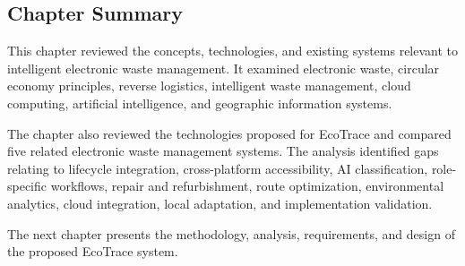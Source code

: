 \subsection{Chapter Summary}

This chapter reviewed the concepts, technologies, and existing systems relevant
to intelligent electronic waste management. It examined electronic waste,
circular economy principles, reverse logistics, intelligent waste management,
cloud computing, artificial intelligence, and geographic information systems.

The chapter also reviewed the technologies proposed for EcoTrace and
compared five related electronic waste management systems. The analysis
identified gaps relating to lifecycle integration, cross-platform accessibility, AI
classification, role-specific workflows, repair and refurbishment, route
optimization, environmental analytics, cloud integration, local adaptation, and
implementation validation.

The next chapter presents the methodology, analysis, requirements, and design
of the proposed EcoTrace system.
